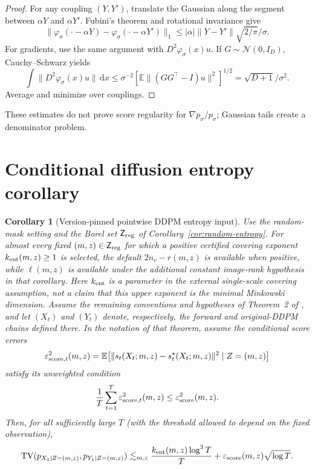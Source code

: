 \documentclass[11pt]{article}
\newtheorem{corollary}[theorem]{Corollary}
\theoremstyle{definition}
\newcommand{\TV}{\operatorname{TV}}
\newcommand{\dd}{\,\mathrm d}
\begin{document}
\begin{proof}
For any coupling $(Y,Y')$, translate the Gaussian along the segment between
$\alpha Y$ and $\alpha Y'$.  Fubini's theorem and rotational invariance give
\[
 \|\varphi_\sigma(\cdot-\alpha Y)
 -\varphi_\sigma(\cdot-\alpha Y')\|_1
 \le |\alpha|\|Y-Y'\|\sqrt{2/\pi}/\sigma.
\]
For gradients, use the same argument with $D^2\varphi_\sigma(x)u$.  If
$G\sim\mathcal N(0,I_D)$, Cauchy--Schwarz yields
\[
 \int\|D^2\varphi_\sigma(x)u\|\dd x
 \le\sigma^{-2}\left[\mathbb E\|(GG^\top-I)u\|^2\right]^{1/2}
 =\sqrt{D+1}/\sigma^2.
\]
Average and minimize over couplings.
\end{proof}

These estimates do not prove score regularity for
$\nabla p_\sigma/p_\sigma$; Gaussian tails create a denominator problem.

\section{Conditional diffusion entropy corollary}

\begin{corollary}[Version-pinned pointwise DDPM entropy input]
\label{cor:ddpm}
Use the random-mask setting and the Borel set $\mathsf Z_{\rm reg}$ of
Corollary~\ref{cor:random-entropy}.  For almost every fixed
$(m,z)\in\mathsf Z_{\rm reg}$ for which a positive certified covering exponent
$k_{\rm ent}(m,z)\ge1$ is selected, the default $2n_v-r(m,z)$ is available
when positive, while $\ell(m,z)$ is available under the additional constant
image-rank hypothesis in that corollary.  Here $k_{\rm ent}$ is a parameter in
the external single-scale covering assumption, not a claim that this upper
exponent is the minimal Minkowski dimension.  Assume the remaining conventions
and hypotheses of Theorem~2 of
\citet[arXiv version 2]{liang2025lowdim}, and let $(X_t)$ and $(Y_t)$ denote,
respectively, the forward and original-DDPM chains defined there.  In the
notation of that theorem, assume
the conditional score errors
\[
 \varepsilon_{{\rm score},t}^2(m,z)
 =\mathbb E\!\left[
 \|s_t(X_t;m,z)-s_t^\star(X_t;m,z)\|^2
 \mid Z=(m,z)\right]
\]
satisfy its unweighted condition
\[
 \frac1T\sum_{t=1}^T
 \varepsilon_{{\rm score},t}^2(m,z)
 \le\varepsilon_{\rm score}^2(m,z).
\]
Then, for all sufficiently large $T$ (with the threshold allowed to depend on
the fixed observation),
\[
 \TV(p_{X_1\mid Z=(m,z)},p_{Y_1\mid Z=(m,z)})
 \lesssim_{m,z}
 \frac{k_{\rm ent}(m,z)\log^3T}{T}
 +\varepsilon_{\rm score}(m,z)\sqrt{\log T}.
\]
\end{corollary}
\end{document}
